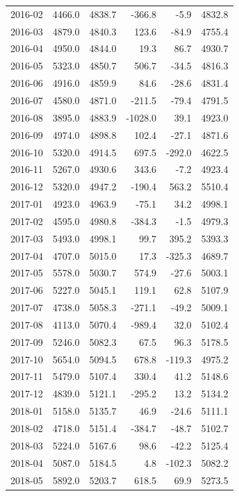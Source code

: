 \begin{longtable}{lrrrrr}
2016-02 & 4466.0 & 4838.7 & -366.8 & -5.9 & 4832.8 \\ 
2016-03 & 4879.0 & 4840.3 & 123.6 & -84.9 & 4755.4 \\ 
2016-04 & 4950.0 & 4844.0 & 19.3 & 86.7 & 4930.7 \\ 
2016-05 & 5323.0 & 4850.7 & 506.7 & -34.5 & 4816.3 \\ 
2016-06 & 4916.0 & 4859.9 & 84.6 & -28.6 & 4831.4 \\ 
2016-07 & 4580.0 & 4871.0 & -211.5 & -79.4 & 4791.5 \\ 
2016-08 & 3895.0 & 4883.9 & -1028.0 & 39.1 & 4923.0 \\ 
2016-09 & 4974.0 & 4898.8 & 102.4 & -27.1 & 4871.6 \\ 
2016-10 & 5320.0 & 4914.5 & 697.5 & -292.0 & 4622.5 \\ 
2016-11 & 5267.0 & 4930.6 & 343.6 & -7.2 & 4923.4 \\ 
2016-12 & 5320.0 & 4947.2 & -190.4 & 563.2 & 5510.4 \\ 
2017-01 & 4923.0 & 4963.9 & -75.1 & 34.2 & 4998.1 \\ 
2017-02 & 4595.0 & 4980.8 & -384.3 & -1.5 & 4979.3 \\ 
2017-03 & 5493.0 & 4998.1 & 99.7 & 395.2 & 5393.3 \\ 
2017-04 & 4707.0 & 5015.0 & 17.3 & -325.3 & 4689.7 \\ 
2017-05 & 5578.0 & 5030.7 & 574.9 & -27.6 & 5003.1 \\ 
2017-06 & 5227.0 & 5045.1 & 119.1 & 62.8 & 5107.9 \\ 
2017-07 & 4738.0 & 5058.3 & -271.1 & -49.2 & 5009.1 \\ 
2017-08 & 4113.0 & 5070.4 & -989.4 & 32.0 & 5102.4 \\ 
2017-09 & 5246.0 & 5082.3 & 67.5 & 96.3 & 5178.5 \\ 
2017-10 & 5654.0 & 5094.5 & 678.8 & -119.3 & 4975.2 \\ 
2017-11 & 5479.0 & 5107.4 & 330.4 & 41.2 & 5148.6 \\ 
2017-12 & 4839.0 & 5121.1 & -295.2 & 13.2 & 5134.2 \\ 
2018-01 & 5158.0 & 5135.7 & 46.9 & -24.6 & 5111.1 \\ 
2018-02 & 4718.0 & 5151.4 & -384.7 & -48.7 & 5102.7 \\ 
2018-03 & 5224.0 & 5167.6 & 98.6 & -42.2 & 5125.4 \\ 
2018-04 & 5087.0 & 5184.5 & 4.8 & -102.3 & 5082.2 \\ 
2018-05 & 5892.0 & 5203.7 & 618.5 & 69.9 & 5273.5 \\ 

\end{longtable}
